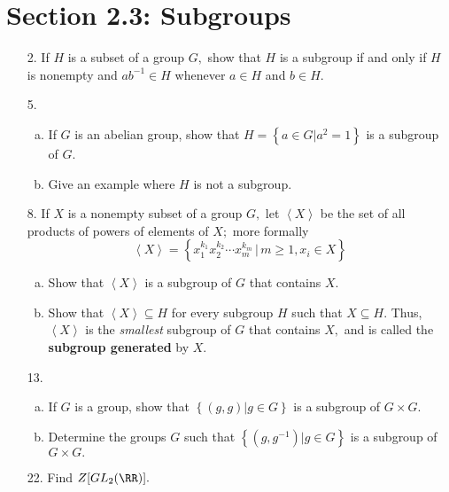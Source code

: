 \documentclass{article}
\begin{document}
\section*{Section 2.3: Subgroups}
\begin{itemize}
	\item[2.] If $H$ is a subset of a group $G,$ show that $H$ is a subgroup if and only if $H$ is nonempty and $ab^{-1}\in H$ whenever $a\in H$ and $b\in H.$

	\item[5.] 
		\begin{enumerate}[(a)]
			\item If $G$ is an abelian group, show that $H=\left\{ a\in G | a^2=1 \right\}$ is a subgroup of $G.$

			\item Give an example where $H$ is not a subgroup.
				
		\end{enumerate}

	\item[8.] If $X$ is a nonempty subset of a group $G,$ let $\left< X\right>$ be the set of all products of powers of elements of $X;$ more formally \[\left< X\right>=\left\{ x_1^{k_1}x_2^{k_2}\cdots x_m^{k_m}\, |\, m\ge 1, x_i\in X \right\}\]
		\begin{enumerate}[(a)]
			\item Show that $\left< X\right>$ is a subgroup of $G$ that contains $X.$

			\item Show that $\left< X\right>\subseteq H$ for every subgroup $H$ such that $X\subseteq H.$ Thus, $\left< X\right>$ is the \textit{smallest} subgroup of $G$ that contains $X,$ and is called the \textbf{subgroup generated} by $X.$
				
		\end{enumerate}

	\item[13.] 
		\begin{enumerate}[(a)]
			\item If $G$ is a group, show that $\left\{ (g, g) | g\in G \right\}$ is a subgroup of $G\times G.$

			\item Determine the groups $G$ such that $\left\{ (g, g^{-1})|g\in G \right\}$ is a subgroup of $G\times G.$
				
		\end{enumerate}

	\item[22.] Find $Z[GL_2(\RR)].$
		
\end{itemize}
\end{document}
